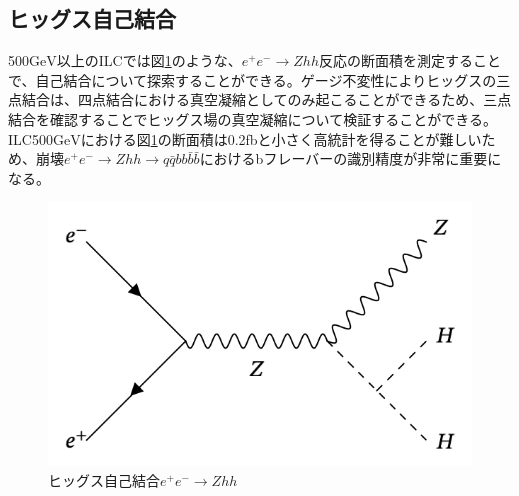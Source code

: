 \subsection{ヒッグス自己結合}
500$\mathrm{GeV}$以上のILCでは図\ref{selfcoupling}のような、$e^+e^- \rightarrow Zhh$反応の断面積を測定することで、自己結合について探索することができる。ゲージ不変性によりヒッグスの三点結合は、四点結合における真空凝縮としてのみ起こることができるため、三点結合を確認することでヒッグス場の真空凝縮について検証することができる。ILC500$\mathrm{GeV}$における図\ref{selfcoupling}の断面積は0.2fbと小さく高統計を得ることが難しいため、崩壊$e^+e^- \rightarrow Zhh \rightarrow q\bar{q}bb\bar{b}\bar{b}$におけるbフレーバーの識別精度が非常に重要になる。
\begin{figure}[h]
	\begin{center}
 \includegraphics[keepaspectratio, scale=0.3]
 	{Figure/Introduction/selfcoupling.png}
 		\caption{ヒッグス自己結合$e^+e^- \rightarrow Zhh$}
 		\label{selfcoupling}
	\end{center}
\end{figure}
